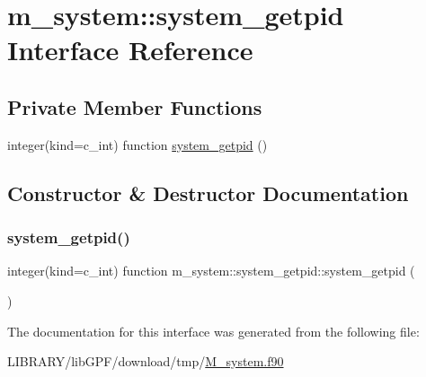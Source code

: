 \hypertarget{interfacem__system_1_1system__getpid}{}\section{m\+\_\+system\+:\+:system\+\_\+getpid Interface Reference}
\label{interfacem__system_1_1system__getpid}
\subsection*{Private Member Functions}
\begin{DoxyCompactItemize}
\item 
integer(kind=c\+\_\+int) function \hyperlink{interfacem__system_1_1system__getpid_aeda96889f0386104d7228ecd6bbddad8}{system\+\_\+getpid} ()
\end{DoxyCompactItemize}


\subsection{Constructor \& Destructor Documentation}
\mbox{\label{interfacem__system_1_1system__getpid_aeda96889f0386104d7228ecd6bbddad8}} 
\subsubsection{\texorpdfstring{system\+\_\+getpid()}{system\_getpid()}}
{\footnotesize\ttfamily integer(kind=c\+\_\+int) function m\+\_\+system\+::system\+\_\+getpid\+::system\+\_\+getpid (\begin{DoxyParamCaption}{ }\end{DoxyParamCaption})\hspace{0.3cm}{\ttfamily [private]}}



The documentation for this interface was generated from the following file\+:\begin{DoxyCompactItemize}
\item 
L\+I\+B\+R\+A\+R\+Y/lib\+G\+P\+F/download/tmp/\hyperlink{M__system_8f90}{M\+\_\+system.\+f90}\end{DoxyCompactItemize}
